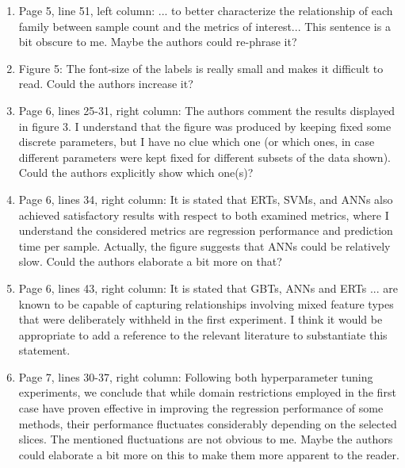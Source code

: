 \documentclass[12pt]{article}
\begin{document}
\begin{enumerate}
{\bf }

\item Page 5, line 51, left column:
... to better characterize the relationship of each family between sample count and the metrics of interest... This sentence is a bit obscure to me. Maybe the authors could re-phrase it?

{\bf }

\item Figure 5:
The font-size of the labels is really small and makes it difficult to read. Could the authors increase it?

{\bf }

\item Page 6, lines 25-31, right column:
The authors comment the results displayed in figure 3. I understand that the figure was produced by keeping fixed some discrete parameters, but I have no clue which one (or which ones, in case different parameters were kept fixed for different subsets of the data shown). Could the authors explicitly show which one(s)?

{\bf }

\item Page 6, lines 34, right column:
It is stated that ERTs, SVMs, and ANNs also achieved satisfactory results with respect to both examined metrics, where I understand the considered metrics are regression performance and prediction time per sample. Actually, the figure suggests that ANNs could be relatively slow. Could the authors elaborate a bit more on that?

{\bf }

\item Page 6, lines 43, right column:
It is stated that GBTs, ANNs and ERTs ... are known to be capable of capturing relationships involving mixed feature types that were deliberately withheld in the first experiment. I think it would be appropriate to add a reference to the relevant literature to substantiate this statement.

{\bf }

\item Page 7, lines 30-37, right column:
Following both hyperparameter tuning experiments, we conclude that while domain restrictions employed in the first case have proven effective in improving the regression performance of some methods, their performance fluctuates considerably depending on the selected slices. The mentioned fluctuations are not obvious to me. Maybe the authors could elaborate a bit more on this to make them more apparent to the reader.


\end{enumerate}
\end{document}
